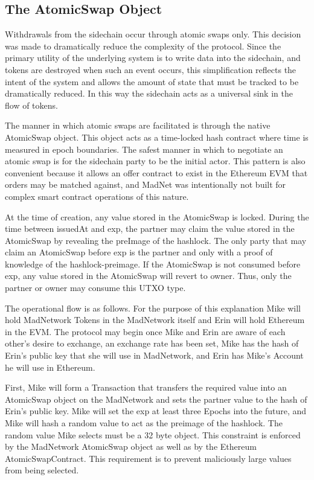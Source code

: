 \subsection{The AtomicSwap Object}



Withdrawals from the sidechain occur through atomic swaps only.
This decision was made to dramatically reduce the complexity of the
protocol.
Since the primary utility of the underlying system is to write data
into the sidechain, and tokens are destroyed when such an event occurs,
this simplification reflects the intent of the system and allows the
amount of state that must be tracked to be dramatically reduced.
In this way the sidechain acts as a universal sink in the flow of
tokens.

The manner in which atomic swaps are facilitated is through the native
AtomicSwap object.
This object acts as a time-locked hash contract where time is measured
in epoch boundaries.
The safest manner in which to negotiate an atomic swap is for the
sidechain party to be the initial actor.
This pattern is also convenient because it allows an offer contract to
exist in the Ethereum EVM that orders may be matched against, and
MadNet was intentionally not built for complex smart contract
operations of this nature.

At the time of creation, any value stored in the AtomicSwap is locked.
During the time between issuedAt and exp, the partner may claim the
value stored in the AtomicSwap by revealing the preImage of the
hashlock.
The only party that may claim an AtomicSwap before exp is the partner
and only with a proof of knowledge of the hashlock-preimage.
If the AtomicSwap is not consumed before exp, any value stored in the
AtomicSwap will revert to owner.
Thus, only the partner or owner may consume this UTXO type.

The operational flow is as follows.
For the purpose of this explanation Mike will hold MadNetwork Tokens in
the MadNetwork itself and Erin will hold Ethereum in the EVM.
The protocol may begin once Mike and Erin are aware of each other's
desire to exchange, an exchange rate has been set, Mike has the hash of
Erin's public key that she will use in MadNetwork, and Erin has
Mike's Account he will use in Ethereum.

First, Mike will form a Transaction that transfers the required value
into an AtomicSwap object on the MadNetwork and sets the partner value
to the hash of Erin's public key.
Mike will set the exp at least three Epochs into the future, and Mike
will hash a random value to act as the preimage of the hashlock.
The random value Mike selects must be a 32 byte object.
This constraint is enforced by the MadNetwork AtomicSwap object as well
as by the Ethereum AtomicSwapContract.
This requirement is to prevent maliciously large values from being
selected.

